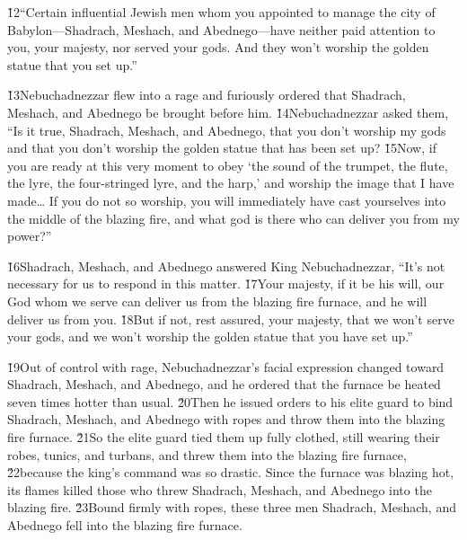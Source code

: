 \v{12}``Certain influential Jewish men whom you appointed to manage the city of Babylon---Shadrach, Meshach, and Abednego---have neither paid attention to you, your majesty, nor served your gods. And they won't worship the golden statue that you set up.''

\v{13}Nebuchadnezzar flew into a rage and furiously ordered that Shadrach, Meshach, and Abednego be brought before him. \v{14}Nebuchadnezzar asked them, ``Is it true, Shadrach, Meshach, and Abednego, that you don't worship my gods and that you don't worship the golden statue that has been set up? \v{15}Now, if you are ready at this very moment to obey `the sound of the trumpet, the flute, the lyre, the four-stringed lyre, and the harp,' and worship the image that I have made{\ldots} If you do not so worship, you will immediately have cast yourselves into the middle of the blazing fire, and what god is there who can deliver you from my power?''

\v{16}Shadrach, Meshach, and Abednego answered King Nebuchadnezzar, ``It's not necessary for us to respond in this matter. \v{17}Your majesty, if it be his will, our God whom we serve can deliver us from the blazing fire furnace, and he will deliver us from you. \v{18}But if not, rest assured, your majesty, that we won't serve your gods, and we won't worship the golden statue that you have set up.''

\v{19}Out of control with rage, Nebuchadnezzar's facial expression changed toward Shadrach, Meshach, and Abednego, and he ordered that the furnace be heated seven times hotter than usual. \v{20}Then he issued orders to his elite guard to bind Shadrach, Meshach, and Abednego with ropes and throw them into the blazing fire furnace. \v{21}So the elite guard tied them up fully clothed, still wearing their robes, tunics, and turbans, and threw them into the blazing fire furnace, \v{22}because the king's command was so drastic. Since the furnace was blazing hot, its flames killed those who threw Shadrach, Meshach, and Abednego into the blazing fire. \v{23}Bound firmly with ropes, these three men Shadrach, Meshach, and Abednego fell into the blazing fire furnace.

